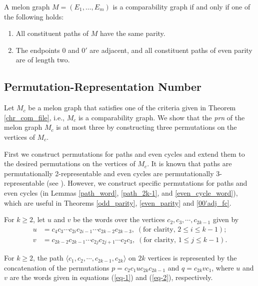 \documentclass{llncs}
\begin{document}
\begin{theorem}\label{chr_com_file}
	A melon graph $M = (E_1, \ldots, E_m)$ is a comparability graph if and only if one of the following holds: 
	\begin{enumerate}
		\item All constituent paths of $M$ have the same parity.
		\item The endpoints $0$ and $0'$ are adjacent, and all constituent paths of even parity are of length two. 
	\end{enumerate}	
\end{theorem}


\subsection{Permutation-Representation Number}
\label{prn_melon}

Let $M_c$ be a melon graph that satisfies one of the criteria given in Theorem \ref{chr_com_file}, i.e., $M_c$ is a comparability graph.  We show that the \textit{prn} of the melon graph $M_c$ is at most three by constructing three permutations on the vertices of $M_c$. 

First we construct permutations for paths and even cycles and extend them to the desired permutations on the vertices of $M_c$. 
It is known that paths are permutationally 2-representable and even cycles are permutationally 3-representable (see \cite{trotter_dim}). However, we construct specific permutations for paths and even cycles (in Lemmas \ref{path_word}, \ref{path_2k-1}, and \ref{even_cycle_word}), which are useful in Theorems \ref{odd_parity}, \ref{even_parity} and \ref{00'adj_fc}.   

For $k \ge 2$, let $u$ and $v$ be the words over the vertices $c_2, c_3, \cdots, c_{2k-1}$ given by 
\begin{eqnarray}
	\label{eq-1} u &= c_{4} c_{3} \cdots c_{2i} c_{2i-1} \cdots c_{2k-2} c_{2k-3},\; (\text{for clarity, } 2 \le i \le k-1);\\
	\label{eq-2} v &= c_{2k-2} c_{2k-1} \cdots c_{2j} c_{2j+1} \cdots c_2 c_3,\; (\text{for clarity, } 1 \le j \le k-1).
\end{eqnarray} 

\begin{lemma} \label{path_word}
	For $k \ge 2$, the path $\langle  c_1, c_2,  \cdots, c_{2k-1}, c_{2k} \rangle$ on $2k$ vertices is represented by the concatenation of the permutations $p = c_{2} c_1 u c_{2k} c_{2k-1}$ and $q =c_{2k}  v c_1$, where $u$ and $v$ are the words given in equations (\ref{eq-1}) and (\ref{eq-2}), respectively.
\end{lemma}
\end{document}
